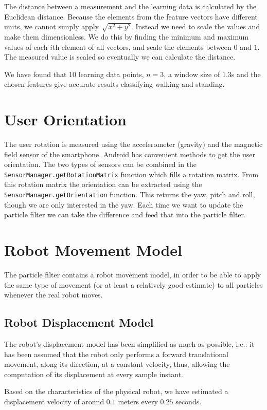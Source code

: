 \documentclass[journal]{IEEEtran}
\begin{document}
The distance between a measurement and the learning data is calculated by the
Euclidean distance. Because the elements from the feature vectors have
different units, we cannot simply apply $\sqrt{ x^2+y^2 }$. Instead we need to
scale the values and make them dimensionless. We do this by finding the minimum
and maximum values of each $i$th element of all vectors, and scale the elements
between $0$ and $1$. The measured value is scaled so eventually we can
calculate the distance.

We have found that 10 learning data points, $n=3$, a window size of $1.3$s
and the chosen features give accurate results classifying walking and standing.

\section{User Orientation}
The user rotation is measured using the accelerometer (gravity) and the
magnetic field sensor of the smartphone. Android has convenient methods to get
the user orientation. The two types of sensors can be combined in the
\texttt{SensorManager.getRotationMatrix} function which fills a rotation
matrix. From this rotation matrix the orientation can be extracted using the
\texttt{SensorManager.getOrientation} function. This returns the yaw, pitch
and roll, though we are only interested in the yaw. Each time we want to update
the particle filter we can take the difference and feed that into the particle
filter.

\section{Robot Movement Model}
The particle filter contains a robot movement model, in order to be able to apply the same type of movement (or at least a relatively good estimate) to all particles whenever the real robot moves.

\subsection{Robot Displacement Model}
The robot's displacement model has been simplified as much as possible, i.e.: it has been assumed that the robot only performs a forward translational movement, along its direction, at a constant velocity, thus, allowing the computation of its displacement at every sample instant.

Based on the characteristics of the physical robot, we have estimated a displacement velocity of around $0.1$ meters every $0.25$ seconds.
\end{document}
